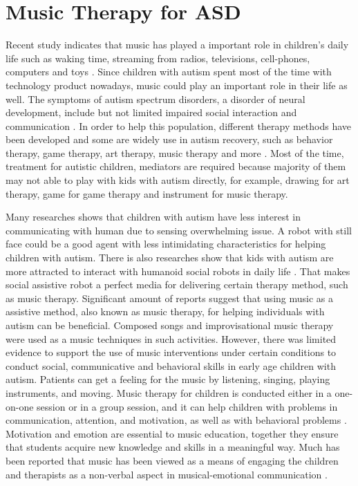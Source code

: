 \section{Music Therapy for ASD}

Recent study indicates that music has played a important role in children's daily life such as 
waking time, streaming from radios, televisions, cell-phones, computers and 
toys \cite{young2007toward}. Since children with autism spent most of the time with 
technology product nowadays, music could play an important role in their life as well.
The symptoms of autism spectrum disorders, a disorder of neural development, include but not 
limited impaired social interaction and communication \cite{rapin2008autism}. In order to help
this population, different therapy methods have been developed and some are widely use in autism
recovery, such as behavior therapy, game therapy, art therapy, music therapy and more \cite{bryson2003autism}. 
Most of the time, treatment for autistic children, mediators are required because majority of them
may not able to play with kids with autism directly, for example, drawing for art therapy, game 
for game therapy and instrument for music therapy. 

Many researches shows that children with autism
have less interest in communicating with human due to sensing overwhelming issue. A robot with still
face could be a good agent with less intimidating characteristics for helping children with autism.
There is also researches show that kids with autism are more attracted to interact with humanoid 
social robots in daily life \cite{wainer2010collaborating, robins2012embodiment,costa2013your, feng2013can}.
That makes social assistive robot a perfect media for delivering certain therapy method, such as 
music therapy. Significant amount of reports suggest that using music as a assistive method, also known as music therapy, for 
helping individuals with autism can be beneficial. Composed songs and improvisational
music therapy were used as a music techniques in such activities. However, there 
was limited evidence to support the use of music interventions under certain
conditions to conduct social, communicative and behavioral skills in early age children 
with autism. Patients can get a feeling for the music by listening, singing, playing instruments, and moving. Music
therapy for children is conducted either in a one-on-one session or in a group session, and
it can help children with problems in communication, attention, and motivation, as well as 
with behavioral problems \cite{gifford2011using}. Motivation and emotion are essential to music 
education, together they ensure that students acquire new knowledge and skills in a meaningful way.
Much has been reported that music has been viewed as a means of engaging the children and 
therapists as a non-verbal aspect in musical-emotional communication \cite{warwick1991music}.\\


